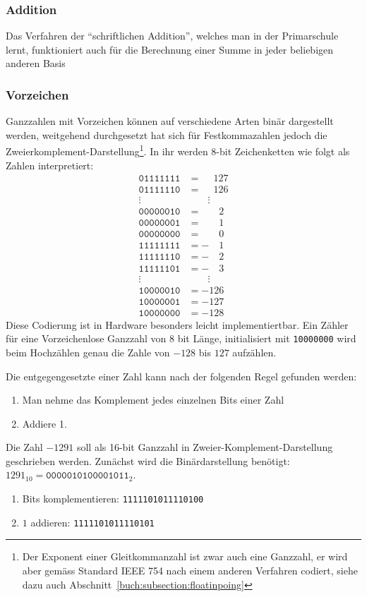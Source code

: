 \subsubsection{Addition}
Das Verfahren der ``schriftlichen Addition'', welches man in der Primarschule
lernt, funktioniert auch für die Berechnung einer Summe in jeder beliebigen
anderen Basis

\subsubsection{Vorzeichen}
Ganzzahlen mit Vorzeichen können auf verschiedene Arten binär dargestellt
werden, weitgehend durchgesetzt hat sich für Festkommazahlen jedoch die
Zweierkomplement-Darstellung\footnote{Der Exponent einer Gleitkommanzahl
ist zwar auch eine Ganzzahl, er wird aber gemäss Standard IEEE 754
nach einem anderen Verfahren codiert, siehe dazu auch
Abschnitt~\ref{buch:subsection:floatinpoing}}.
In ihr werden 8-bit Zeichenketten wie folgt als Zahlen interpretiert:
\begin{align*}
\texttt{01111111}&= \phantom{-}127\\
\texttt{01111110}&= \phantom{-}126\\
\vdots\quad&\qquad\vdots\\
\texttt{00000010}&= \phantom{-00}2\\
\texttt{00000001}&= \phantom{-00}1\\
\texttt{00000000}&= \phantom{-00}0\\
\texttt{11111111}&= -\phantom{00}1\\
\texttt{11111110}&= -\phantom{00}2\\
\texttt{11111101}&= -\phantom{00}3\\
\vdots\quad&\qquad\vdots\\
\texttt{10000010}&=-126\\
\texttt{10000001}&=-127\\
\texttt{10000000}&=-128
\end{align*}
Diese Codierung ist in Hardware besonders leicht implementiertbar.
Ein Zähler für eine Vorzeichenlose Ganzzahl von 8 bit Länge, initialisiert
mit \texttt{10000000} wird beim Hochzählen genau die Zahle von $-128$
bis $127$ aufzählen.

Die entgegengesetzte einer Zahl kann nach der folgenden Regel gefunden werden:
\begin{enumerate}
\item Man nehme das Komplement jedes einzelnen Bits einer Zahl
\item Addiere 1.
\end{enumerate}
\begin{beispiel}
Die Zahl $-1291$ soll als 16-bit Ganzzahl in Zweier-Komplement-Darstellung
geschrieben werden.
Zunächst wird die Binärdarstellung benötigt:
$1291_{10}= \texttt{0000010100001011}_2$.
\begin{enumerate}
\item Bits komplementieren: \texttt{1111101011110100}
\item $1$ addieren: \texttt{1111101011110101}
\qedhere
\end{enumerate}
\end{beispiel}


